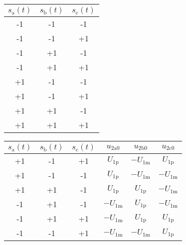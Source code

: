 \begin{solutionblock}
    \begin{minipage}{0.3\textwidth}
            \begin{tabular}{|c|c|c|} %
            \hline
            \bfseries $s_\mathrm{a}(t)$ & \bfseries $s_\mathrm{b}(t)$ & \bfseries $s_\mathrm{c}(t)$ \\ \hline
            -1 & -1 & -1 \\ \hline
            -1 & -1 & +1 \\ \hline
            -1 & +1 & -1 \\ \hline
            -1 & +1 & +1 \\ \hline
            +1 & -1 & -1 \\ \hline
            +1 & -1 & +1 \\ \hline
            +1 & +1 & -1 \\ \hline
            +1 & +1 & +1 \\ \hline
        \end{tabular}
        \noindent
        \label{stable:ex07_Task2_Switchingstates}    
    \end{minipage}
    \hfill
    \begin{minipage}{0.55\textwidth} 
        \begin{tabular}{|c|c|c|c|c|c|} %
            \hline
            \bfseries $s_\mathrm{a}(t)$ & \bfseries $s_\mathrm{b}(t)$ & \bfseries $s_\mathrm{c}(t)$
            & \bfseries $u_\mathrm{2a0}$ & \bfseries $u_\mathrm{2b0}$ & \bfseries $u_\mathrm{2c0}$ \\ \hline
            +1 & -1 & +1 & $U_\mathrm{1p}$ & $-U_\mathrm{1m}$ & $U_\mathrm{1p}$ \\ \hline
            +1 & -1 & -1 & $U_\mathrm{1p}$ & $-U_\mathrm{1m}$ & $-U_\mathrm{1m}$ \\ \hline
            +1 & +1 & -1 & $U_\mathrm{1p}$ & $U_\mathrm{1p}$ & $-U_\mathrm{1m}$ \\ \hline
            -1 & +1 & -1 & $-U_\mathrm{1m}$ & $U_\mathrm{1p}$ & $-U_\mathrm{1m}$ \\ \hline
            -1 & +1 & +1 & $-U_\mathrm{1m}$ & $U_\mathrm{1p}$ & $U_\mathrm{1p}$ \\ \hline
            -1 & -1 & +1 & $-U_\mathrm{1m}$ & $-U_\mathrm{1m}$ & $U_\mathrm{1p}$ \\ \hline
        \end{tabular}
        \label{stable:ex07_Task2_UsedSwitchingStates}    

\end{minipage}
\end{solutionblock}
